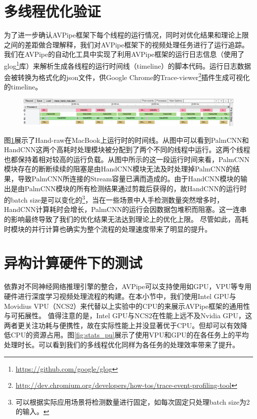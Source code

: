\section{多线程优化验证}
为了进一步确认AVPipe框架下每个线程的运行情况，同时对优化结果和理论上限之间的差距做合理解释，我们对AVPipe框架下的视频处理任务进行了运行追踪。我们在AVPipe的自动化工具中实现了利用AVPipe框架的运行日志信息（使用了glog\footnote{\url{https://github.com/google/glog}}库）来解析生成各线程的运行时间线（timeline）的脚本代码。运行日志数据会被转换为格式化的json文件，供Google Chrome的Trace-viewer\footnote{\url{http://dev.chromium.org/developers/how-tos/trace-event-profiling-tool}}插件生成可视化的timeline。\par
\begin{figure}[htp]
    \centering
    \includegraphics[width=\textwidth]{figure/trace.png}
    \label{fig:trace}
\end{figure}
图\ref{fig:trace}展示了Hand-raw在MacBook上运行时的时间线。从图中可以看到PalmCNN和HandCNN这两个高耗时处理模块被分配到了两个不同的线程中运行。这两个线程也都保持着相对较高的运行负载。从图中所示的这一段运行时间来看，PalmCNN模块存在的断断续续的阻塞是由HandCNN模块无法及时处理掉PalmCNN的结果，导致PalmCNN所连接的Stream容量已满而造成的。由于HandCNN模块的输出是由PalmCNN模块的所有检测结果通过剪裁后获得的，故HandCNN的运行时的batch size是可以变化的\footnote{可以根据实际应用场景将检测数量进行固定，如每次固定只处理batch size为2的输入。}，当在一些场景中人手检测数量突然增多时，HandCNN计算耗时会增长，PalmCNN的运行会因数据包堆积而阻塞。这一连串的影响最终导致了我们的优化结果无法达到理论上的优化上限。
尽管如此，高耗时模块的并行计算也确实为整个流程的处理速度带来了明显的提升。

\section{异构计算硬件下的测试}
依靠对不同神经网络推理引擎的整合，AVPipe可以支持使用如GPU，VPU等专用硬件进行深度学习视频处理流程的构建。在本小节中，我们使用Intel GPU与Movidius VPU（NCS2）来代替以上实验中的CPU的来展示AVPipe框架的通用性与可拓展性。
值得注意的是，Intel GPU与NCS2在性能上远不及Nvidia GPU，这两者更关注功耗与便携性，故在实际性能上并没显著优于CPU。但却可以有效降低CPU的资源占用。图\ref{fig:stats_pu}展示了使用VPU和GPU的在各任务上的平均处理时长。可以看到我们的多线程优化同样为各任务的处理效率带来了提升。\par

